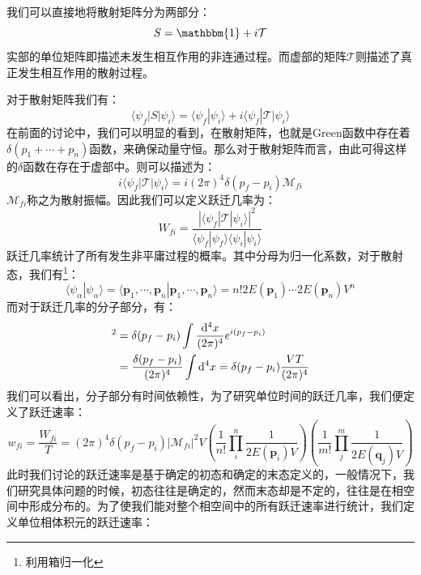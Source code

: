 我们可以直接地将散射矩阵分为两部分：
\begin{equation}
S=\mathbbm{1}+i\mathcal{T}
\end{equation}
实部的单位矩阵即描述未发生相互作用的非连通过程。而虚部的矩阵$\mathcal{T}$则描述了真正发生相互作用的散射过程。

对于散射矩阵我们有：
\begin{equation}
\langle \psi_f|S|\psi_i\rangle=\langle \psi_f|\psi_i\rangle+i\langle\psi_f|\mathcal{T}|\psi_i\rangle
\end{equation}
在前面的讨论中，我们可以明显的看到，在散射矩阵，也就是Green函数中存在着$\delta(p_1+\cdots+p_n)$函数，来确保动量守恒。那么对于散射矩阵而言，由此可得这样的$\delta$函数在存在于虚部中。则可以描述为：
\begin{equation}
i\langle\psi_f|\mathcal{T}|\psi_i\rangle=i(2\pi)^4\delta(p_f-p_i)\mathcal{M}_{fi}
\label{eq:scattT}
\end{equation}
$\mathcal{M}_{fi}$称之为散射振幅。因此我们可以定义跃迁几率为：
\begin{equation}
W_{fi}=\frac{|\langle\psi_f|\mathcal{T}|\psi_i\rangle|^2}{\langle\psi_f|\psi_f\rangle\langle\psi_i|\psi_i\rangle}
\end{equation}
跃迁几率统计了所有发生非平庸过程的概率。其中分母为归一化系数，对于散射态，我们有\footnote{利用箱归一化}：
\begin{equation}
\langle\psi_\alpha|\psi_\alpha\rangle=\langle \boldsymbol{p}_1,\cdots,\boldsymbol{p}_n|\boldsymbol{p}_1,\cdots,\boldsymbol{p}_n\rangle=n!2E(\boldsymbol{p}_1)\cdots 2E(\boldsymbol{p}_n)V^n
\end{equation}
而对于跃迁几率的分子部分，有：
\begin{align}
[\delta(p_f-p_i)]^2&=\delta(p_f-p_i)\int\frac{\mathrm{d}^4x}{(2\pi)^4}e^{i(p_f-p_i)}\notag\\
&=\frac{\delta(p_f-p_i)}{(2\pi)^4}\int\mathrm{d}^4x=\delta(p_f-p_i)\frac{VT}{(2\pi)^4}
\end{align}
我们可以看出，分子部分有时间依赖性，为了研究单位时间的跃迁几率，我们便定义了跃迁速率：
\begin{equation}
w_{fi}=\frac{W_{fi}}{T}=(2\pi)^4\delta(p_f-p_i)|\mathcal{M}_{fi}|^2 V\left(\frac{1}{n!}\prod_{i}^{n}\frac{1}{2E(\boldsymbol{p}_i)V}\right)\left(\frac{1}{m!}\prod_{j}^{m}\frac{1}{2E(\boldsymbol{q}_j)V}\right)
\end{equation}
此时我们讨论的跃迁速率是基于确定的初态和确定的末态定义的，一般情况下，我们研究具体问题的时候，初态往往是确定的，然而末态却是不定的，往往是在相空间中形成分布的。为了使我们能对整个相空间中的所有跃迁速率进行统计，我们定义单位相体积元的跃迁速率：

